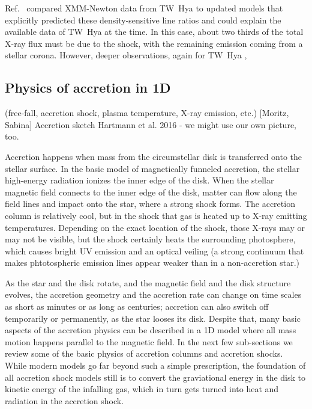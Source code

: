 Ref.~\cite{Guenther_2007} compared XMM-Newton data from TW~Hya to updated models that explicitly predicted these density-sensitive line ratios and could explain the available data of TW~Hya at the time. In this case, about two thirds of the total X-ray flux must be due to the shock, with the remaining emission coming from a stellar corona. However, deeper observations, again for TW~Hya \cite{Brickhouse_2010}, 


\subsection{Physics of accretion in 1D}
\label{sect:accretionphysics}
{\color{blue}(free-fall, accretion shock, plasma temperature, X-ray emission, etc.) [Moritz, Sabina]
Accretion sketch Hartmann et al. 2016 - we might use our own picture, too.

}

Accretion happens when mass from the circumstellar disk is transferred onto the stellar surface. In the basic model of magnetically funneled accretion, the stellar high-energy radiation ionizes the inner edge of the disk. When the stellar magnetic field connects to the inner edge of the disk, matter can flow along the field lines and impact onto the star, where a strong shock forms. The accretion column is relatively cool, but in the shock that gas is heated up to X-ray emitting temperatures. Depending on the exact location of the shock, those X-rays may or may not be visible, but the shock certainly heats the surrounding photosphere, which causes bright UV emission and an optical veiling (a strong continuum that makes phtotospheric emission lines appear weaker than in a non-accretion star.)

As the star and the disk rotate, and the magnetic field and the disk structure evolves, the accretion geometry and the accretion rate can change on time scales as short as minutes or as long as centuries; accretion can also switch off temporarily or permanently, as the star looses its disk. Despite that, many basic aspects of the accretion physics can be described in a 1D model where all mass motion happens parallel to the magnetic field. In the next few sub-sections we review some of the basic physics of accretion columns and accretion shocks. While modern models go far beyond such a simple prescription, the foundation of all accretion shock models still is to convert the graviational energy in the disk to kinetic energy of the infalling gas, which in turn gets turned into heat and radiation in the accretion shock.

